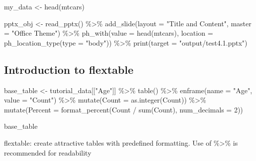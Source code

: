 \documentclass[
]{book}
\newenvironment{Shaded}{\begin{snugshade}}{\end{snugshade}}
\newcommand{\AttributeTok}[1]{\textcolor[rgb]{0.77,0.63,0.00}{#1}}
\newcommand{\DecValTok}[1]{\textcolor[rgb]{0.00,0.00,0.81}{#1}}
\newcommand{\FunctionTok}[1]{\textcolor[rgb]{0.00,0.00,0.00}{#1}}
\newcommand{\NormalTok}[1]{#1}
\newcommand{\OtherTok}[1]{\textcolor[rgb]{0.56,0.35,0.01}{#1}}
\newcommand{\SpecialCharTok}[1]{\textcolor[rgb]{0.00,0.00,0.00}{#1}}
\newcommand{\StringTok}[1]{\textcolor[rgb]{0.31,0.60,0.02}{#1}}
\begin{document}
\begin{Shaded}
\begin{Highlighting}[]
\NormalTok{my\_data }\OtherTok{\textless{}{-}} \FunctionTok{head}\NormalTok{(mtcars)}

\NormalTok{pptx\_obj }\OtherTok{\textless{}{-}} \FunctionTok{read\_pptx}\NormalTok{() }\SpecialCharTok{\%\textgreater{}\%}
  \FunctionTok{add\_slide}\NormalTok{(}\AttributeTok{layout =} \StringTok{"Title and Content"}\NormalTok{, }\AttributeTok{master =} \StringTok{"Office Theme"}\NormalTok{) }\SpecialCharTok{\%\textgreater{}\%}
  \FunctionTok{ph\_with}\NormalTok{(}\AttributeTok{value =} \FunctionTok{head}\NormalTok{(mtcars), }\AttributeTok{location =} \FunctionTok{ph\_location\_type}\NormalTok{(}\AttributeTok{type =} \StringTok{"body"}\NormalTok{)) }\SpecialCharTok{\%\textgreater{}\%}
  \FunctionTok{print}\NormalTok{(}\AttributeTok{target =} \StringTok{"output/test4.1.pptx"}\NormalTok{) }
\end{Highlighting}
\end{Shaded}

\hypertarget{introduction-to-flextable}{%
\subsection{Introduction to flextable}\label{introduction-to-flextable}}

\begin{Shaded}
\begin{Highlighting}[]
\NormalTok{base\_table }\OtherTok{\textless{}{-}}\NormalTok{ tutorial\_data[[}\StringTok{"Age"}\NormalTok{]] }\SpecialCharTok{\%\textgreater{}\%}
  \FunctionTok{table}\NormalTok{() }\SpecialCharTok{\%\textgreater{}\%}
  \FunctionTok{enframe}\NormalTok{(}\AttributeTok{name =} \StringTok{"Age"}\NormalTok{, }\AttributeTok{value =} \StringTok{"Count"}\NormalTok{) }\SpecialCharTok{\%\textgreater{}\%}
  \FunctionTok{mutate}\NormalTok{(}\AttributeTok{Count =} \FunctionTok{as.integer}\NormalTok{(Count)) }\SpecialCharTok{\%\textgreater{}\%}
  \FunctionTok{mutate}\NormalTok{(}\AttributeTok{Percent =} \FunctionTok{format\_percent}\NormalTok{(Count }\SpecialCharTok{/} \FunctionTok{sum}\NormalTok{(Count), }\AttributeTok{num\_decimals =} \DecValTok{2}\NormalTok{))}

\NormalTok{base\_table }
\end{Highlighting}
\end{Shaded}

flextable: create attractive tables with predefined formatting. Use of \%\textgreater\% is recommended for readability
\end{document}
